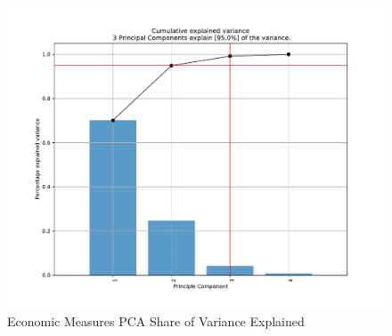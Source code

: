 \documentclass{report}
\begin{document}
	\begin{figure}[h!]
		\centering
		\caption{Economic Measures PCA Share of Variance Explained}
		\label{Econ_Share_Explained}	
		\includegraphics[width=\linewidth,keepaspectratio=true]{../Output/Figures/Econ_Indicator_Share_Explained.pdf}
	\end{figure}
\end{document}
